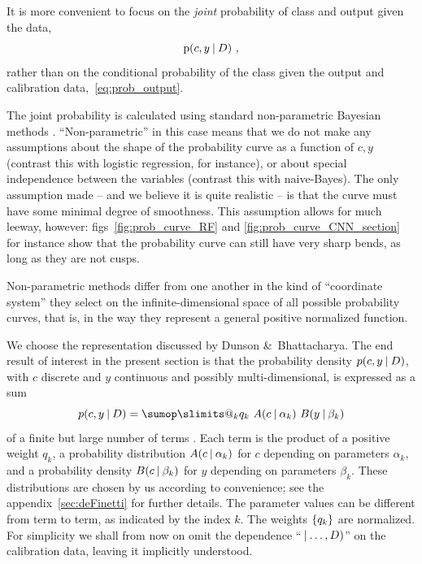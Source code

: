 \documentclass[\ifafour a4paper,12pt,\else a5paper,10pt,\fi%
onecolumn,oneside,article,%
british%
]{memoir}
\makeatletter
\theoremstyle{remark}
\theoremstyle{innote}
\def\sum{\DOTSI\sumop\slimits@}
\newcommand*{\amp}{\&}
\DeclarePairedDelimiter\set{\{}{\}} %
\newcommand*{\p}{\mathrm{p}}%
\renewcommand*{\|}[1][]{\nonscript\:#1\vert\nonscript\:\mathopen{}}
\newcommand*{\figs}{figs}%
\newcommand*{\eg}{{e.g.}}
\makeatother
\begin{document}
It is more convenient to focus on the \emph{joint} probability of class and output given the data,
\begin{equation}
  \label{eq:prob_output}
  \p(c, y \| D) \ ,
\end{equation}
rather than on the conditional probability of the class given the output and calibration data,~\eqref{eq:prob_output}.

The joint probability is calculated using standard non-parametric Bayesian methods \autocites[for introductions and reviews see \eg][]{walker2013,muelleretal2004b,hjort1996}. \enquote{Non-parametric} in this case means that we do not make any assumptions about the shape of the probability curve as a function of $c,y$ (contrast this with logistic regression, for instance), or about special independence between the variables (contrast this with naive-Bayes). The only assumption made -- and we believe it is quite realistic -- is that the curve must have some minimal degree of smoothness. This assumption allows for much leeway, however: \figs~\ref{fig:prob_curve_RF} and \ref{fig:prob_curve_CNN_section} for instance show that the probability curve can still have very sharp bends, as long as they are not cusps.

Non-parametric methods differ from one another in the kind of \enquote{coordinate system} they select on the infinite-dimensional space of all possible probability curves, that is, in the way they represent a general positive normalized function.

We choose the representation discussed by Dunson \amp\ Bhattacharya\autocites{dunsonetal2011}[see also the special case discussed by][]{rasmussen1999}. The end result of interest in the present section is that the probability density $p(c,y \| D)$, with $c$ discrete and $y$ continuous and possibly multi-dimensional, is expressed as a sum
\begin{equation}
  \label{eq:representation_P}
  p(c, y \| D) = \sum_{k} q_{k}\ A(c \| \alpha_{k})\ B(y \| \beta_{k})
\end{equation}
of a finite but large number of terms \autocites[see][on why the number of terms does not need to be infinite]{ishwaranetal2002b}. Each term is the product of a positive weight $q_{k}$, a probability distribution $A(c \| \alpha_{k})$ for $c$ depending on parameters $\alpha_{k}$, and a probability density $B(c \| \beta_{k})$ for $y$ depending on parameters $\beta_{k}$. These distributions are chosen by us according to convenience; see the appendix~\ref{sec:deFinetti} for further details. The parameter values can be different from term to term, as indicated by the index $k$. The weights $\set{q_{k}}$ are normalized. For simplicity we shall from now on omit the dependence \enquote{$\|\dotsc, D)$} on the calibration data, leaving it implicitly understood.
\end{document}

